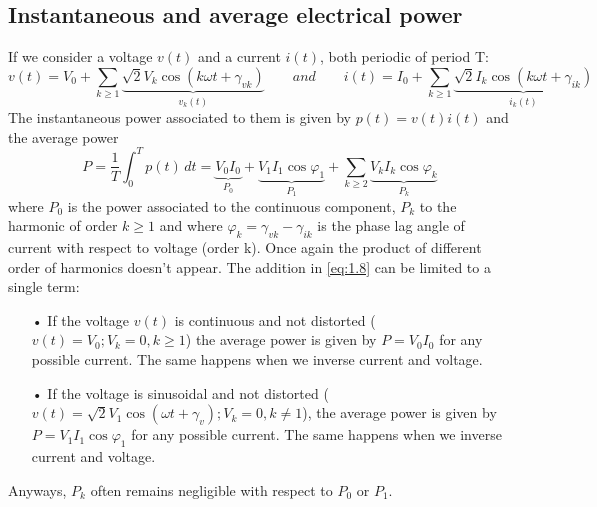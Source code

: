	\subsection{Instantaneous and average electrical power}
	    If we consider a voltage $v(t)$ and a current $i(t)$, both periodic of period T:
		\begin{equation}
			v(t) = V_0 + \sum _{k \geq 1} \underbrace{\sqrt{2} V_k \cos (k\omega t+ \gamma _{vk})}_{v_k(t)} \qquad and \qquad
			i(t) = I_0 + \sum _{k \geq 1} \underbrace{\sqrt{2} I_k \cos (k\omega t+ \gamma _{ik})}_{i_k(t)}
		\end{equation}
		The instantaneous power associated to them is given by $p(t) = v(t)i(t)$ and the average power
		\begin{equation}
			P = \frac{1}{T}\int _0 ^T p(t)\, dt = \underbrace{V_0I_0}_{P_0} + \underbrace{V_1I_1\cos \varphi _1}_{P_1} + \sum _{k\geq 2}\underbrace{V_kI_k \cos \varphi _k}_{P_k}
			\label{eq:1.8}
		\end{equation}
		where $P_0$ is the power associated to the continuous component, $P_k$ to the harmonic of order $k\geq 1$ and where $\varphi _k = \gamma _{vk} - \gamma _{ik}$ is the phase lag angle of current with respect to voltage (order k). Once again the product of different order of harmonics doesn't appear. The addition in \eqref{eq:1.8} can be limited to a single term:
		\begin{itemize}
			\item[•] If the voltage $v(t)$ is continuous and not distorted ($v(t) = V_0; V_k = 0, k\geq 1$) the average power is given by $P = V_0I_0$ for any possible current. The same happens when we inverse current and voltage. 
		 
			\item[•] If the voltage is sinusoidal and not distorted ($v(t) = \sqrt{2}V_1\cos (\omega t + \gamma _v); V_k = 0, k\neq 1$), the average power is given by $P = V_1I_1\cos \varphi _1$ for any possible current. The same happens when we inverse current and voltage. 
			
		\end{itemize}
		Anyways, $P_k$ often remains negligible with respect to $P_0$ or $P_1$. 
		
